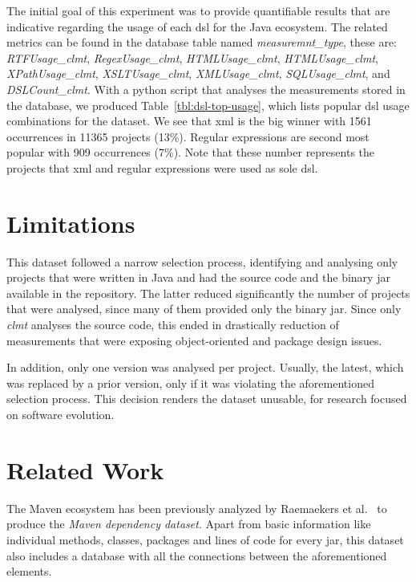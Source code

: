 \documentclass{sig-alternate}
\begin{document}
The initial goal of this experiment was to provide quantifiable results that are indicative regarding the usage of each {\sc dsl} for the Java ecosystem. The related metrics can be found in the database table named \textit{measuremnt\_type}, these are: \textit{RTFUsage\_clmt}, \textit{RegexUsage\_clmt},
\textit{HTMLUsage\_clmt}, \textit{HTMLUsage\_clmt}, \textit{XPathUsage\_clmt}, \textit{XSLTUsage\_clmt}, \textit{XMLUsage\_clmt}, \textit{SQLUsage\_clmt}, and \textit{DSLCount\_clmt}. With a python script that analyses the measurements stored in the database, we produced Table~\ref{tbl:dsl-top-usage}, which lists popular {\sc dsl} usage combinations for the dataset. We see that {\sc xml} is the big winner with 1561 occurrences in 11365 projects (13\%). Regular expressions are second most popular with 909 occurrences (7\%). Note that these number represents the projects that {\sc xml} and regular expressions were used as sole {\sc dsl}.

\section{Limitations}
\label{sec:limit}

This dataset followed a narrow selection process, identifying and analysing only projects that were written in Java and had the source code and the binary {\sc jar} available in the repository. The latter reduced significantly the number of projects that were analysed, since many of them provided only the binary {\sc jar}. Since only \textit{clmt} analyses the source code, this ended in drastically reduction of measurements that were exposing object-oriented and package design issues.

In addition, only one version was analysed per project. Usually, the latest, which was replaced by a prior version, only if it was violating the aforementioned selection process. This decision renders the dataset unusable, for research focused on software evolution.

\section{Related Work}
\label{sec:rel}

The Maven ecosystem has been previously analyzed by Raemaekers et al.~\cite{RDV13} to produce the {\it Maven dependency dataset}. Apart from basic information like individual methods, classes, packages and lines of code for every {\sc jar}, this dataset also includes a database with all the connections between the aforementioned elements.
\end{document}
